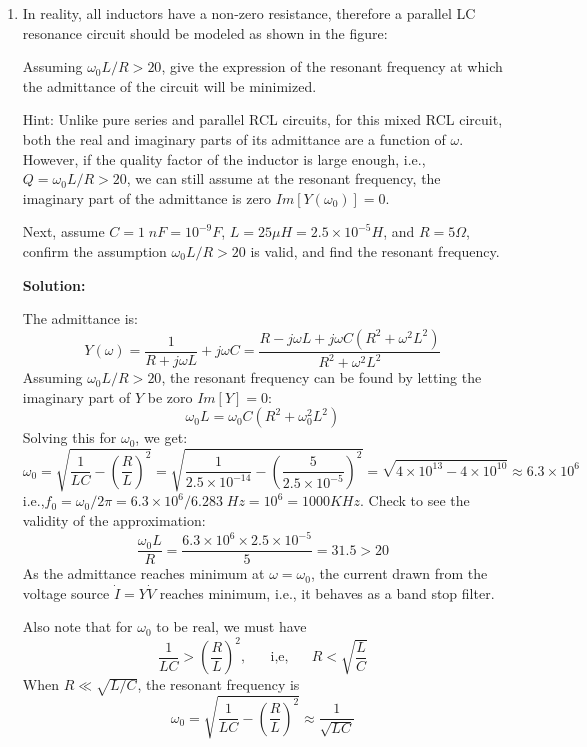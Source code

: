 \begin{enumerate}
\item In reality, all inductors have a non-zero resistance, therefore a 
parallel LC resonance circuit should be modeled as shown in the figure:


Assuming $\omega_0 L/R >20$, give the expression of the resonant 
frequency at which the admittance of the circuit will be minimized.  

Hint: Unlike pure series and parallel RCL circuits, for this mixed RCL
circuit, both the real and imaginary parts of its admittance are a function 
of $\omega$. However, if the quality factor of the inductor is large enough,
i.e., $Q=\omega_0 L/R > 20$, we can still assume at the resonant frequency,
the imaginary part of the admittance is zero $Im[Y(\omega_0)]=0$.

Next, assume $C=1\;nF=10^{-9}F$, $L=25 \mu H=2.5\times 10^{-5}H$, and 
$R=5\Omega$, confirm the assumption $\omega_0 L/R >20$ is valid, and find 
the resonant frequency.

 {\bf Solution:} 
 
 The admittance is:
 \[ Y(\omega)=\frac{1}{R+j\omega L}+j\omega C
    =\frac{R-j\omega L+j\omega C(R^2+\omega^2L^2)}{R^2+\omega^2L^2}
 \]
 Assuming $\omega_0L/R>20$, the resonant frequency can be found by letting
 the imaginary part of $Y$ be zoro $Im[Y]=0$:
 \[ \omega_0 L=\omega_0 C(R^2+\omega_0^2L^2)	\]
 Solving this for $\omega_0$, we get:
 \[ \omega_0=\sqrt{\frac{1}{LC}-(\frac{R}{L})^2}
    =\sqrt{\frac{1}{2.5\times 10^{-14}}-(\frac{5}{2.5\times 10^{-5}})^2}
    =\sqrt{4\times 10^{13}-4\times 10^{10}}\approx 6.3\times 10^6 \]
 i.e.,$f_0=\omega_0/2\pi=6.3\times 10^6/6.283 \;Hz=10^6=1000 KHz$.
Check to see the validity of the approximation:
 \[ \frac{\omega_0L}{R}=\frac{6.3\times 10^6\times 2.5\times 10^{-5}}{5}=31.5 >20 \]
 As the admittance reaches minimum at $\omega=\omega_0$, the current drawn
 from the voltage source $\dot{I}=Y\dot{V}$ reaches minimum, i.e., it 
 behaves as a band stop filter.
  
   Also note that for $\omega_0$ to be real, we must have
   \[	\frac{1}{LC} > (\frac{R}{L})^2, \;\;\;\;\;\;\mbox{i,e,}
   	\;\;\;\;\;\;R<\sqrt{\frac{L}{C}}	\]
   When $R \ll \sqrt{L/C}$, the resonant frequency is
   \[
   \omega_0=\sqrt{\frac{1}{LC}-(\frac{R}{L})^2}\approx \frac{1}{\sqrt{LC}}	
   \]

%
% 


\end{enumerate}
